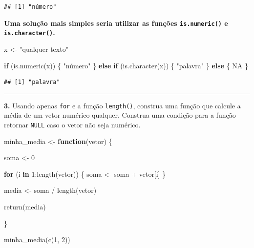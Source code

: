 \documentclass[
]{book}
\newenvironment{Shaded}{\begin{snugshade}}{\end{snugshade}}
\newcommand{\ConstantTok}[1]{\textcolor[rgb]{0.00,0.00,0.00}{#1}}
\newcommand{\ControlFlowTok}[1]{\textcolor[rgb]{0.13,0.29,0.53}{\textbf{#1}}}
\newcommand{\DecValTok}[1]{\textcolor[rgb]{0.00,0.00,0.81}{#1}}
\newcommand{\FunctionTok}[1]{\textcolor[rgb]{0.00,0.00,0.00}{#1}}
\newcommand{\NormalTok}[1]{#1}
\newcommand{\OtherTok}[1]{\textcolor[rgb]{0.56,0.35,0.01}{#1}}
\newcommand{\SpecialCharTok}[1]{\textcolor[rgb]{0.00,0.00,0.00}{#1}}
\newcommand{\StringTok}[1]{\textcolor[rgb]{0.31,0.60,0.02}{#1}}
\begin{document}
\begin{verbatim}
## [1] "número"
\end{verbatim}

\textbf{Uma solução mais simples seria utilizar as funções \texttt{is.numeric()} e \texttt{is.character()}.}

\begin{Shaded}
\begin{Highlighting}[]
\NormalTok{x }\OtherTok{\textless{}{-}} \StringTok{"qualquer texto"}

\ControlFlowTok{if}\NormalTok{ (}\FunctionTok{is.numeric}\NormalTok{(x)) \{}
  \StringTok{"número"}
\NormalTok{\} }\ControlFlowTok{else} \ControlFlowTok{if}\NormalTok{ (}\FunctionTok{is.character}\NormalTok{(x)) \{}
  \StringTok{"palavra"}
\NormalTok{\} }\ControlFlowTok{else}\NormalTok{ \{}
  \ConstantTok{NA}
\NormalTok{\}}
\end{Highlighting}
\end{Shaded}

\begin{verbatim}
## [1] "palavra"
\end{verbatim}

\begin{center}\rule{0.5\linewidth}{0.5pt}\end{center}

\textbf{3.} Usando apenas \texttt{for} e a função \texttt{length()}, construa uma função que calcule a média de um vetor numérico qualquer. Construa uma condição para a função retornar \texttt{NULL} caso o vetor não seja numérico.

\begin{Shaded}
\begin{Highlighting}[]
\NormalTok{minha\_media }\OtherTok{\textless{}{-}} \ControlFlowTok{function}\NormalTok{(vetor) \{}

\NormalTok{  soma }\OtherTok{\textless{}{-}} \DecValTok{0}
  
  \ControlFlowTok{for}\NormalTok{ (i }\ControlFlowTok{in} \DecValTok{1}\SpecialCharTok{:}\FunctionTok{length}\NormalTok{(vetor)) \{}
\NormalTok{    soma }\OtherTok{\textless{}{-}}\NormalTok{ soma }\SpecialCharTok{+}\NormalTok{ vetor[i]}
\NormalTok{  \}}
  
\NormalTok{  media }\OtherTok{\textless{}{-}}\NormalTok{ soma }\SpecialCharTok{/} \FunctionTok{length}\NormalTok{(vetor)  }
  
  \FunctionTok{return}\NormalTok{(media)}
  
\NormalTok{\}}

\FunctionTok{minha\_media}\NormalTok{(}\FunctionTok{c}\NormalTok{(}\DecValTok{1}\NormalTok{, }\DecValTok{2}\NormalTok{))}
\end{Highlighting}
\end{Shaded}
\end{document}
